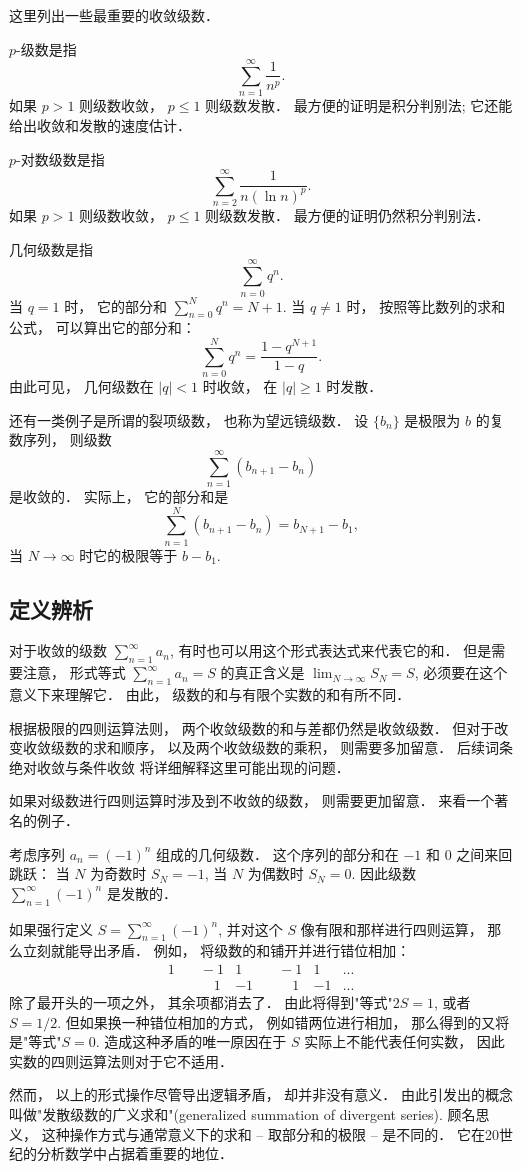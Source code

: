 这里列出一些最重要的收敛级数．

$p$-级数是指
$$
\sum_{n=1}^\infty\frac{1}{n^p}.
$$
如果 $p>1$ 则级数收敛， $p\leq1$ 则级数发散． 最方便的证明是积分判别法; 它还能给出收敛和发散的速度估计．

$p$-对数级数是指
$$
\sum_{n=2}^\infty\frac{1}{n(\ln n)^p}.
$$
如果 $p>1$ 则级数收敛， $p\leq1$ 则级数发散． 最方便的证明仍然积分判别法．

几何级数是指
$$
\sum_{n=0}^\infty q^n.
$$
当 $q=1$ 时， 它的部分和 $\sum_{n=0}^N q^n=N+1$. 当 $q\neq1$ 时， 按照等比数列的求和公式， 可以算出它的部分和：
$$
\sum_{n=0}^N q^n=\frac{1-q^{N+1}}{1-q}.
$$
由此可见， 几何级数在 $|q|<1$ 时收敛， 在 $|q|\geq1$ 时发散．

还有一类例子是所谓的裂项级数， 也称为望远镜级数． 设 $\{b_n\}$ 是极限为 $b$ 的复数序列， 则级数
$$
\sum_{n=1}^\infty(b_{n+1}-b_n)
$$
是收敛的． 实际上， 它的部分和是
$$
\sum_{n=1}^N(b_{n+1}-b_n)=b_{N+1}-b_1,
$$
当 $N\to\infty$ 时它的极限等于 $b-b_1$.

\subsection{定义辨析}
对于收敛的级数 $\sum_{n=1}^\infty a_n$, 有时也可以用这个形式表达式来代表它的和． 但是需要注意， 形式等式 $\sum_{n=1}^\infty a_n=S$ 的真正含义是 $\lim_{N\to\infty}S_N=S$, 必须要在这个意义下来理解它． 由此， 级数的和与有限个实数的和有所不同． 

根据极限的四则运算法则， 两个收敛级数的和与差都仍然是收敛级数． 但对于改变收敛级数的求和顺序， 以及两个收敛级数的乘积， 则需要多加留意． 后续词条绝对收敛与条件收敛 将详细解释这里可能出现的问题．

如果对级数进行四则运算时涉及到不收敛的级数， 则需要更加留意． 来看一个著名的例子．

\begin{example}{}
考虑序列 $a_n=(-1)^n$ 组成的几何级数． 这个序列的部分和在 $-1$ 和 $0$ 之间来回跳跃： 当 $N$ 为奇数时 $S_N=-1$, 当 $N$ 为偶数时 $S_N=0$. 因此级数 $\sum_{n=1}^\infty(-1)^n$ 是发散的． 

如果强行定义 $S=\sum_{n=1}^\infty(-1)^n$, 并对这个 $S$ 像有限和那样进行四则运算， 那么立刻就能导出矛盾． 例如， 将级数的和铺开并进行错位相加：
$$
\begin{aligned}
1 & \quad-1 & 1 & \quad-1 & 1 &...\\
  & \quad\quad1 & -1 & \quad\quad1 & -1 &...
\end{aligned}
$$
除了最开头的一项之外， 其余项都消去了． 由此将得到"等式"$2S=1$, 或者 $S=1/2$. 但如果换一种错位相加的方式， 例如错两位进行相加， 那么得到的又将是"等式"$S=0$. 造成这种矛盾的唯一原因在于 $S$ 实际上不能代表任何实数， 因此实数的四则运算法则对于它不适用．

然而， 以上的形式操作尽管导出逻辑矛盾， 却并非没有意义． 由此引发出的概念叫做"发散级数的广义求和"(generalized summation of divergent series). 顾名思义， 这种操作方式与通常意义下的求和 -- 取部分和的极限 -- 是不同的． 它在20世纪的分析数学中占据着重要的地位．
\end{example}